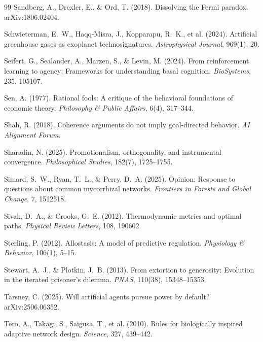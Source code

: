 \documentclass[11pt,twocolumn]{article}
\begin{document}
\begin{thebibliography}{99}
 Sandberg, A., Drexler, E., \& Ord, T. (2018). Dissolving the Fermi paradox. arXiv:1806.02404.

 Schwieterman, E.~W., Haqq-Misra, J., Kopparapu, R.~K., et al. (2024). Artificial greenhouse gases as exoplanet technosignatures. \emph{Astrophysical Journal}, 969(1), 20.

 Seifert, G., Sealander, A., Marzen, S., \& Levin, M. (2024). From reinforcement learning to agency: Frameworks for understanding basal cognition. \emph{BioSystems}, 235, 105107.

 Sen, A. (1977). Rational fools: A critique of the behavioral foundations of economic theory. \emph{Philosophy \& Public Affairs}, 6(4), 317--344.

 Shah, R. (2018). Coherence arguments do not imply goal-directed behavior. \emph{AI Alignment Forum}.

 Sharadin, N. (2025). Promotionalism, orthogonality, and instrumental convergence. \emph{Philosophical Studies}, 182(7), 1725--1755.

 Simard, S.~W., Ryan, T.~L., \& Perry, D.~A. (2025). Opinion: Response to questions about common mycorrhizal networks. \emph{Frontiers in Forests and Global Change}, 7, 1512518.

 Sivak, D.~A., \& Crooks, G.~E. (2012). Thermodynamic metrics and optimal paths. \emph{Physical Review Letters}, 108, 190602.

 Sterling, P. (2012). Allostasis: A model of predictive regulation. \emph{Physiology \& Behavior}, 106(1), 5--15.

 Stewart, A.~J., \& Plotkin, J.~B. (2013). From extortion to generosity: Evolution in the iterated prisoner's dilemma. \emph{PNAS}, 110(38), 15348--15353.

 Tarsney, C. (2025). Will artificial agents pursue power by default? arXiv:2506.06352.

 Tero, A., Takagi, S., Saigusa, T., et al. (2010). Rules for biologically inspired adaptive network design. \emph{Science}, 327, 439--442.


\end{thebibliography}
\end{document}
